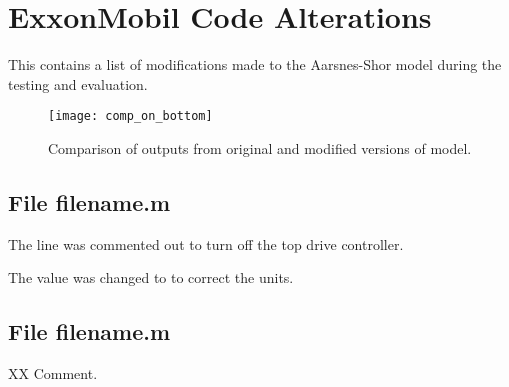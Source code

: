 \chapter{ExxonMobil Code Alterations}
This \appendixname{} contains a list of modifications made to the Aarsnes-Shor model during the testing and evaluation.


\begin{figure}
  \centering
  \texttt{[image: comp\_on\_bottom]}
  \caption[Output comparison]{Comparison of outputs from original and modified versions of model.}\label{Comaprison_on_bottom}
\end{figure}


\section{File {\codefont filename.m}}
\begin{codemodifications}

\begin{codemodification}{19}
The line was commented out to turn off the top drive controller.
\end{codemodification}

\begin{codemodification}{25}%
The value  was changed to  to correct the units.
\end{codemodification}

\begin{codemodification}{29}
\lipsum[1]
\end{codemodification}

\end{codemodifications}

\section{File {\codefont filename.m}}
\begin{codemodifications}

\begin{codemodification}{XX}
Comment.
\end{codemodification}

\end{codemodifications} 